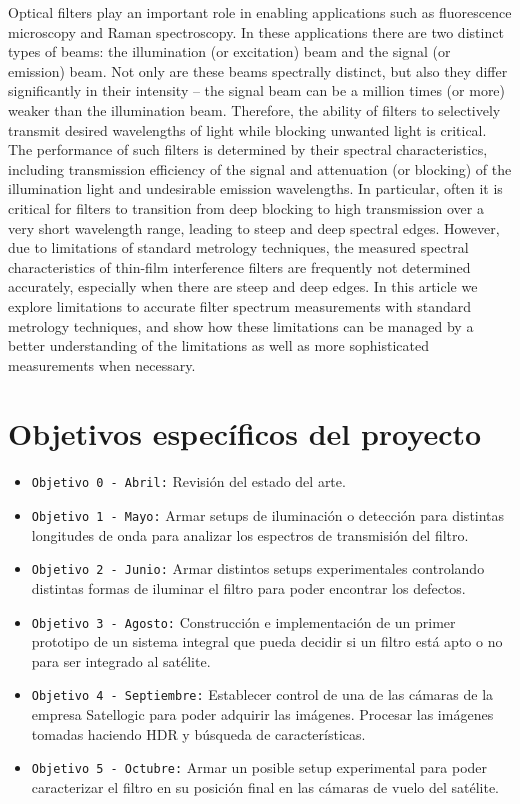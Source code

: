 \documentclass{ctuthesis}
\begin{document}
Optical filters play an important role in enabling applications such as fluorescence
microscopy and Raman spectroscopy. In these applications there are two distinct types of
beams: the illumination (or excitation) beam and the signal (or emission) beam. Not only are
these beams spectrally distinct, but also they differ significantly in their intensity – the signal
beam can be a million times (or more) weaker than the illumination beam. Therefore, the ability
of filters to selectively transmit desired wavelengths of light while blocking unwanted light is
critical. The performance of such filters is determined by their spectral characteristics, including
transmission efficiency of the signal and attenuation (or blocking) of the illumination light and
undesirable emission wavelengths. In particular, often it is critical for filters to transition from
deep blocking to high transmission over a very short wavelength range, leading to steep and
deep spectral edges.
However, due to limitations of standard metrology techniques, the
measured spectral characteristics of thin-film interference filters are frequently not determined
accurately, especially when there are steep and deep edges.
In this article we explore limitations to accurate filter spectrum measurements with
standard metrology techniques, and show how these limitations can be managed by a better
understanding of the limitations as well as more sophisticated measurements when necessary.

\section*{Objetivos específicos del proyecto}
\begin{itemize}
	
	\item \texttt{Objetivo 0 - Abril:} Revisión del estado del arte.
	\item \texttt{Objetivo 1 - Mayo:} Armar setups de iluminación o detección para distintas longitudes de onda para analizar
	los espectros de transmisión del filtro.
	\item \texttt{Objetivo 2 - Junio:} Armar distintos setups experimentales controlando distintas formas de iluminar el filtro
	para poder encontrar los defectos.
	\item \texttt{Objetivo 3 - Agosto:} Construcción e implementación de un primer prototipo de un sistema integral que pueda decidir si un filtro está apto o no para ser integrado al satélite.
	\item \texttt{Objetivo 4 - Septiembre:} Establecer control de una de las cámaras de la empresa Satellogic para poder adquirir las
	imágenes. Procesar las imágenes tomadas haciendo HDR y búsqueda de características.
	\item \texttt{Objetivo 5 - Octubre:} Armar un posible setup experimental para poder caracterizar el filtro en su posición final
	en las cámaras de vuelo del satélite.
\end{itemize}
\end{document}
